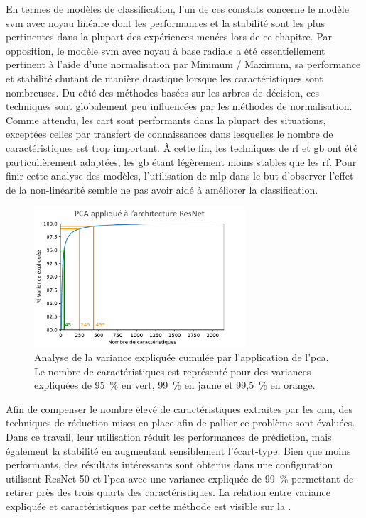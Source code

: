En termes de modèles de classification, l'un de ces constats concerne le modèle \gls{svm} avec noyau linéaire dont les performances et la stabilité sont les plus pertinentes dans la plupart des expériences menées lors de ce chapitre. Par opposition, le modèle \gls{svm} avec noyau à base radiale a été essentiellement pertinent à l'aide d'une normalisation par Minimum / Maximum, sa performance et stabilité chutant de manière drastique lorsque les caractéristiques sont nombreuses. Du côté des méthodes basées sur les arbres de décision, ces techniques sont globalement peu influencées par les méthodes de normalisation. Comme attendu, les \gls{cart} sont performants dans la plupart des situations, exceptées celles par transfert de connaissances dans lesquelles le nombre de caractéristiques est trop important. À cette fin, les techniques de \gls{rf} et \gls{gb} ont été particulièrement adaptées, les \gls{gb} étant légèrement moins stables que les \gls{rf}. Pour finir cette analyse des modèles, l'utilisation de \gls{mlp} dans le but d'observer l'effet de la non-linéarité semble ne pas avoir aidé à améliorer la classification.\par

\begin{figure}[H]
    \centering
    \includegraphics[width=0.7\textwidth]{contents/chapter_5/resources/results_image_classification_pca_variance.pdf}
    \caption{Analyse de la variance expliquée cumulée par l'application de l'\gls{pca}. Le nombre de caractéristiques est représenté pour des variances expliquées de 95~\% en vert, 99~\% en jaune et 99,5~\% en orange.}
    \label{fig:results_image_classification_pca_variance}
\end{figure}\par

Afin de compenser le nombre élevé de caractéristiques extraites par les \gls{cnn}, des techniques de réduction mises en place afin de pallier ce problème sont évaluées. Dans ce travail, leur utilisation réduit les performances de prédiction, mais également la stabilité en augmentant sensiblement l'écart-type. Bien que moins performants, des résultats intéressants sont obtenus dans une configuration utilisant ResNet-50 et l'\gls{pca} avec une variance expliquée de 99~\% permettant de retirer près des trois quarts des caractéristiques. La relation entre variance expliquée et caractéristiques par cette méthode est visible sur la .\par

